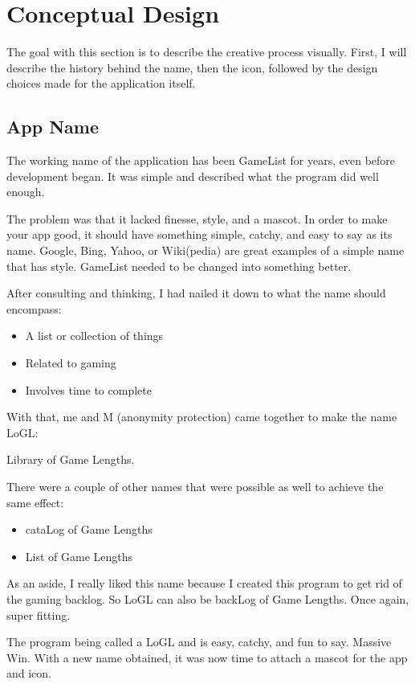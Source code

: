 \section{Conceptual Design}

The goal with this section is to describe the creative process
visually. First, I will describe the history behind the name, then
the icon, followed by the design choices made for the application itself.

\subsection{App Name}

The working name of the application has been GameList for years, even
before development began. It was simple and described what the
program did well enough.

The problem was that it lacked finesse, style, and a mascot. In order
to make your app good, it should have something simple, catchy, and
easy to say as its name. Google, Bing, Yahoo, or Wiki(pedia) are
great examples of a simple name that has style. GameList needed
to be changed into something better.

After consulting and thinking, I had nailed it down to what the name
should encompass:
\begin{itemize}
	\item A list or collection of things
	\item Related to gaming
	\item Involves time to complete
\end{itemize}

With that, me and M (anonymity protection) came together to make the name LoGL:

Library of Game Lengths.

There were a couple of other names that were possible as well to
achieve the same effect:
\begin{itemize}
	\item cataLog of Game Lengths
	\item List of Game Lengths
\end{itemize}

As an aside, I really liked this name because I created this program
to get rid of the gaming backlog. So LoGL can also be backLog of Game
Lengths. Once again, super fitting.

The program being called a LoGL and is easy, catchy, and fun to say.
Massive Win. With a new name obtained, it was now time to attach a
mascot for the app and icon.


